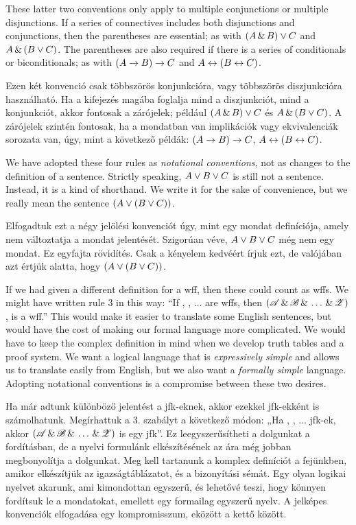These latter two conventions only apply to multiple conjunctions or multiple  disjunctions. If a series of connectives includes both disjunctions and conjunctions, then the parentheses are essential; as with $(A \,\&\, B) \vee C$ and $A \,\&\, (B \vee C)$. The parentheses are also required if there is a series of conditionals or biconditionals; as with $(A \rightarrow B) \rightarrow C$ and $A \leftrightarrow (B \leftrightarrow C)$.

Ezen két konvenció csak többszörös konjunkcióra, vagy többszörös diszjunkcióra használható. Ha a kifejezés magába foglalja mind a diszjunkciót, mind a konjunkciót, akkor fontosak a zárójelek; például $(A \,\&\, B) \vee C$ és $A \,\&\, (B \vee C)$. A zárójelek szintén fontosak, ha a mondatban van implikációk vagy ekvivalenciák sorozata van, úgy, mint a következő példák: 	$(A \rightarrow B) \rightarrow C$, $A \leftrightarrow (B \leftrightarrow C)$.

We have adopted these four rules as \emph{notational conventions}, not as changes to the definition of a sentence. Strictly speaking, $A \vee B \vee C$ is still not a sentence. Instead, it is a kind of shorthand. We write it for the sake of convenience, but we really mean the sentence $(A \vee (B \vee C))$.

Elfogadtuk ezt a négy jelölési konvenciót úgy, mint egy mondat definíciója, amely nem változtatja a mondat jelentését. Szigorúan véve, $A \vee B \vee C$ még nem egy mondat. Ez egyfajta rövidítés. Csak a kényelem kedvéért írjuk ezt, de valójában azt értjük alatta, hogy $(A \vee (B \vee C))$.

If we had given a different definition for a wff, then these could count as wffs. We might have written rule 3 in this way: ``If , , $\ldots$  are wffs, then $(\mathscr{A}\,\&\,\mathscr{B}\,\&\,\ldots\,\&\,\mathscr{Z})$, is a wff.'' This would make it easier to translate some English sentences, but would have the cost of making our formal language more complicated. We would have to keep the complex definition in mind when we develop truth tables and a proof system. We want a logical language that is \emph{expressively simple} and allows us to translate easily from English, but we also want a \emph{formally simple} language. Adopting notational conventions is a compromise between these two desires.

Ha már adtunk különböző jelentést a jfk-eknek, akkor ezekkel jfk-ekként is számolhatunk. Megírhattuk a 3. szabályt a következő módon: „Ha , , $\ldots$  jfk-ek, akkor $(\mathscr{A}\,\&\,\mathscr{B}\,\&\,\ldots\,\&\,\mathscr{Z})$ is egy jfk”. Ez leegyszerűsítheti a dolgunkat a fordításban, de a nyelvi formulánk elkészítésének az ára még jobban megbonyolítja a dolgunkat. Meg kell tartanunk a komplex definíciót a fejünkben, amikor elkészítjük az igazságtáblázatot, és a bizonyítási sémát. Egy olyan logikai nyelvet akarunk, ami kimondottan egyszerű, és lehetővé teszi, hogy könnyen fordítsuk le a mondatokat, emellett egy formailag egyszerű nyelv. A jelképes konvenciók elfogadása egy kompromisszum, eközött a kettő között.

